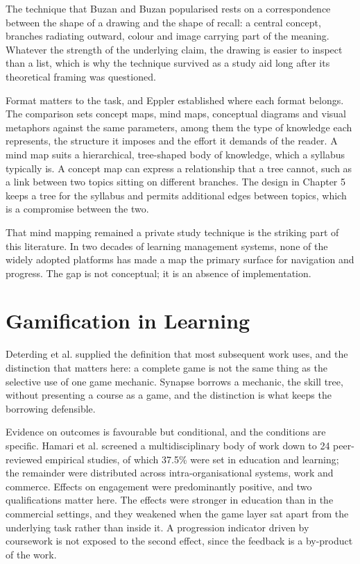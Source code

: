 The technique that Buzan and Buzan \cite{buzan2006mind} popularised rests on a correspondence between the shape of a drawing and the shape of recall: a central concept, branches radiating outward, colour and image carrying part of the meaning. Whatever the strength of the underlying claim, the drawing is easier to inspect than a list, which is why the technique survived as a study aid long after its theoretical framing was questioned.

Format matters to the task, and Eppler \cite{eppler2006comparison} established where each format belongs. The comparison sets concept maps, mind maps, conceptual diagrams and visual metaphors against the same parameters, among them the type of knowledge each represents, the structure it imposes and the effort it demands of the reader. A mind map suits a hierarchical, tree-shaped body of knowledge, which a syllabus typically is. A concept map can express a relationship that a tree cannot, such as a link between two topics sitting on different branches. The design in Chapter 5 keeps a tree for the syllabus and permits additional edges between topics, which is a compromise between the two.

That mind mapping remained a private study technique is the striking part of this literature. In two decades of learning management systems, none of the widely adopted platforms has made a map the primary surface for navigation and progress. The gap is not conceptual; it is an absence of implementation.

\section{Gamification in Learning}

Deterding et al. \cite{deterding2011game} supplied the definition that most subsequent work uses, and the distinction that matters here: a complete game is not the same thing as the selective use of one game mechanic. Synapse borrows a mechanic, the skill tree, without presenting a course as a game, and the distinction is what keeps the borrowing defensible.

Evidence on outcomes is favourable but conditional, and the conditions are specific. Hamari et al. \cite{hamari2014does} screened a multidisciplinary body of work down to 24 peer-reviewed empirical studies, of which 37.5\% were set in education and learning; the remainder were distributed across intra-organisational systems, work and commerce. Effects on engagement were predominantly positive, and two qualifications matter here. The effects were stronger in education than in the commercial settings, and they weakened when the game layer sat apart from the underlying task rather than inside it. A progression indicator driven by coursework is not exposed to the second effect, since the feedback is a by-product of the work.


